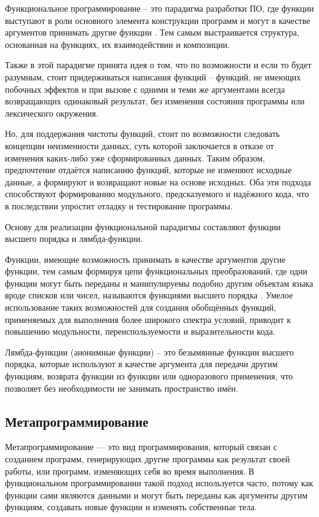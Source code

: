 Функциональное программирование -- это парадигма разработки ПО, где функции выступают в роли основного элемента конструкции программ и могут в качестве аргументов принимать другие функции \cite{e9}. Тем самым выстраивается структура, основанная на функциях, их взаимодействии и композиции.

Также в этой парадигме принята идея о том, что по возможности и если то будет разумным, стоит придерживаться написания  функций -- функций, не имеющих побочных эффектов и при вызове с одними и теми же аргументами всегда возвращающих одинаковый результат, без изменения состояния программы или лексического окружения.

Но, для поддержания чистоты функций, стоит по возможности следовать концепции неизменности данных, суть которой заключается в отказе от изменения каких-либо уже сформированных данных. Таким образом, предпочтение отдаётся написанию функций, которые не изменяют исходные данные, а формируют и возвращают новые на основе исходных. Оба эти подхода способствуют формированию модульного, предсказуемого и надёжного кода, что в последствии упростит отладку и тестирование программы.

Основу для реализации функциональной парадигмы составляют функции высшего порядка и лямбда-функции.

Функции, имеющие возможность принимать в качестве аргументов другие функции, тем самым формируя цепи функциональных преобразований, где одни функции могут быть переданы и манипулируемы подобно другим объектам языка вроде списков или чисел, называются функциями высшего порядка \cite{e12}. Умелое использование таких возможностей для создания обобщённых функций, применяемых для выполнения более широкого спектра условий, приводит к повышению модульности, переиспользуемости и выразительности кода.

Лямбда-функции (анонимные функции) -- это безымянные функции высшего порядка, которые используют в качестве аргумента для передачи другим функциям, возврата функции из функции или одноразового применения, что позволяет без необходимости не занимать пространство имён.

\subsection{Метапрограммирование}
Метапрограммирование — это вид программирования, который связан с созданием программ, генерирующих другие программы как результат своей работы, или программ, изменяющих себя во время выполнения. В функциональном программировании такой подход используется часто, потому как функции сами являются данными и могут быть переданы как аргументы другим функциям, создавать новые функции и изменять собственные тела.

